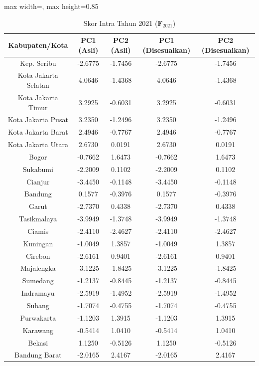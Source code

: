 \begin{table}[H]
\centering
\caption{Skor Intra Tahun 2021 ($\mathbf{F}_{2021}$)} \label{tab:appskor_intra_2021}
\begin{adjustbox}{max width=\textwidth, max height=0.85\textheight}
\begin{tabular}{|c|c|c|c|c|}
\hline
\textbf{Kabupaten/Kota} & \textbf{PC1 (Asli)} & \textbf{PC2 (Asli)} & \textbf{PC1 (Disesuaikan)} & \textbf{PC2 (Disesuaikan)} \\
\hline
Kep. Seribu & -2.6775 & -1.7456 & -2.6775 & -1.7456 \\
Kota Jakarta Selatan & 4.0646 & -1.4368 & 4.0646 & -1.4368 \\
Kota Jakarta Timur & 3.2925 & -0.6031 & 3.2925 & -0.6031 \\
Kota Jakarta Pusat & 3.2350 & -1.2496 & 3.2350 & -1.2496 \\
Kota Jakarta Barat & 2.4946 & -0.7767 & 2.4946 & -0.7767 \\
Kota Jakarta Utara & 2.6730 & 0.0191 & 2.6730 & 0.0191 \\
Bogor & -0.7662 & 1.6473 & -0.7662 & 1.6473 \\
Sukabumi & -2.2009 & 0.1102 & -2.2009 & 0.1102 \\
Cianjur & -3.4450 & -0.1148 & -3.4450 & -0.1148 \\
Bandung & 0.1577 & -0.3976 & 0.1577 & -0.3976 \\
Garut & -2.7370 & 0.4338 & -2.7370 & 0.4338 \\
Tasikmalaya & -3.9949 & -1.3748 & -3.9949 & -1.3748 \\
Ciamis & -2.4110 & -2.4627 & -2.4110 & -2.4627 \\
Kuningan & -1.0049 & 1.3857 & -1.0049 & 1.3857 \\
Cirebon & -2.6161 & 0.9401 & -2.6161 & 0.9401 \\
Majalengka & -3.1225 & -1.8425 & -3.1225 & -1.8425 \\
Sumedang & -1.2137 & -0.8445 & -1.2137 & -0.8445 \\
Indramayu & -2.5919 & -1.4952 & -2.5919 & -1.4952 \\
Subang & -1.7074 & -0.4755 & -1.7074 & -0.4755 \\
Purwakarta & -1.1203 & 1.3915 & -1.1203 & 1.3915 \\
Karawang & -0.5414 & 1.0410 & -0.5414 & 1.0410 \\
Bekasi & 1.1250 & -0.5126 & 1.1250 & -0.5126 \\
Bandung Barat & -2.0165 & 2.4167 & -2.0165 & 2.4167 \\

\end{tabular}
\end{adjustbox}
\end{table}
